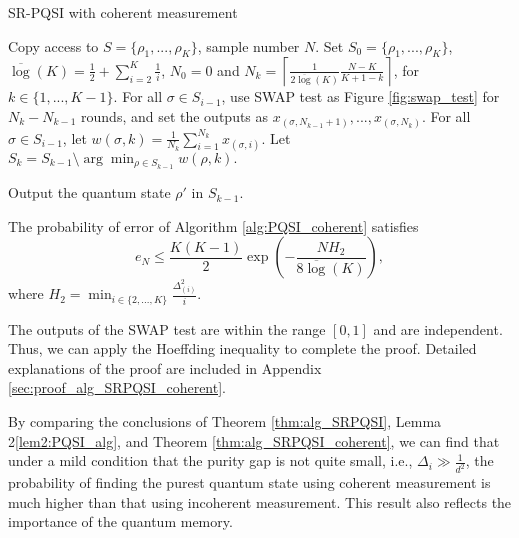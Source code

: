 \begin{algorithm}[htb]
    \caption{SR-PQSI with coherent measurement}
    \label{alg:PQSI_coherent}
    \begin{algorithmic}
     Copy access to $S = \{\rho_1,...,\rho_K\}$, sample number $N$.
     Set $S_0 = \{\rho_1,...,\rho_K\}$, $\overline{\log}(K) = \frac{1}{2} + \sum_{i=2}^K \frac{1}{i}$, $N_0=0$ and $N_k = \left\lceil \frac{1}{2\overline{\log}(K)} \frac{N-K}{K+1-k}\right\rceil$, for $k \in \{1,...,K-1\}$. 
        \STATE For all $\sigma \in S_{i-1}$, use SWAP test as Figure \ref{fig:swap_test} for $N_k - N_{k-1}$ rounds, and set the outputs as $x_{(\sigma, N_{k-1}+1)},..., x_{(\sigma, N_{k})}$.
        \STATE For all $\sigma \in S_{i-1}$, let $w(\sigma, k) = \frac{1}{N_k}\sum_{i=1}^{N_k} x_{(\sigma, i)}$.
        \STATE Let $S_k = S_{k-1} \setminus \arg \min_{\rho \in S_{k-1}} w(\rho,k). $
    \ENDFOR

    \STATE Output the quantum state $\rho'$ in $S_{k-1}$.

\end{algorithmic}
\end{algorithm}

\begin{theorem} \label{thm:alg_SRPQSI_coherent}
    The probability of error of Algorithm \ref{alg:PQSI_coherent} satisfies
    \begin{equation}
         e_N \leq \frac{K(K-1)}{2}\exp\left(- \frac{N H_2}{8\overline{\log}(K) } \right),
    \end{equation}
    where $H_2 = \min_{i \in \{2,...,K\}} \frac{\Delta^2_{(i)}}{i}$.
\end{theorem}
\begin{proof-sketch}
    The outputs of the SWAP test are within the range $[0, 1]$ and are independent. Thus, we can apply the Hoeffding inequality to complete the proof. Detailed explanations of the proof are included in Appendix \ref{sec:proof_alg_SRPQSI_coherent}.
\end{proof-sketch}

By comparing the conclusions of Theorem \ref{thm:alg_SRPQSI}, Lemma 2\ref{lem2:PQSI_alg}, and Theorem \ref{thm:alg_SRPQSI_coherent}, we can find that under a mild condition that the purity gap is not quite small, i.e., $\Delta_i \gg \frac{1}{d^2}$, the probability of finding the purest quantum state using coherent measurement is much higher than that using incoherent measurement. This result also reflects the importance of the quantum memory.